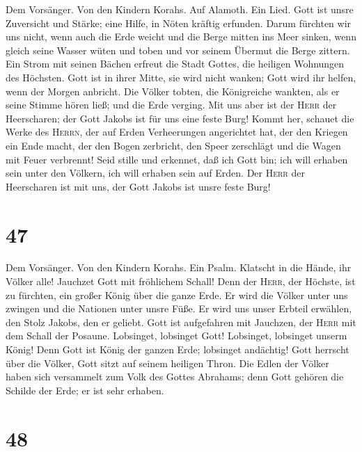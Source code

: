  Dem Vorsänger. Von den Kindern Korahs. Auf Alamoth. Ein
Lied. Gott ist unsre Zuversicht und Stärke; eine Hilfe, in Nöten kräftig
erfunden.  Darum fürchten wir uns nicht, wenn auch die
Erde weicht und die Berge mitten ins Meer sinken,  wenn
gleich seine Wasser wüten und toben und vor seinem Übermut die Berge
zittern.  Ein Strom mit seinen Bächen erfreut die Stadt
Gottes, die heiligen Wohnungen des Höchsten.  Gott ist in
ihrer Mitte, sie wird nicht wanken; Gott wird ihr helfen, wenn der
Morgen anbricht.  Die Völker tobten, die Königreiche
wankten, als er seine Stimme hören ließ; und die Erde verging.
 Mit uns aber ist der \textsc{Herr} der Heerscharen; der
Gott Jakobs ist für uns eine feste Burg!  Kommt her,
schauet die Werke des \textsc{Herrn}, der auf Erden Verheerungen
angerichtet hat,  der den Kriegen ein Ende macht, der den
Bogen zerbricht, den Speer zerschlägt und die Wagen mit Feuer verbrennt!
 Seid stille und erkennet, daß ich Gott bin; ich will
erhaben sein unter den Völkern, ich will erhaben sein auf Erden.
 Der \textsc{Herr} der Heerscharen ist mit uns, der Gott
Jakobs ist unsre feste Burg!

\hypertarget{section-46}{%
\section{47}\label{section-46}}

 Dem Vorsänger. Von den Kindern Korahs. Ein Psalm.
Klatscht in die Hände, ihr Völker alle! Jauchzet Gott mit fröhlichem
Schall!  Denn der \textsc{Herr}, der Höchste, ist zu
fürchten, ein großer König über die ganze Erde.  Er wird
die Völker unter uns zwingen und die Nationen unter unsre Füße.
 Er wird uns unser Erbteil erwählen, den Stolz Jakobs, den
er geliebt.  Gott ist aufgefahren mit Jauchzen, der
\textsc{Herr} mit dem Schall der Posaune.  Lobsinget,
lobsinget Gott! Lobsinget, lobsinget unserm König!  Denn
Gott ist König der ganzen Erde; lobsinget andächtig!  Gott
herrscht über die Völker, Gott sitzt auf seinem heiligen Thron.
 Die Edlen der Völker haben sich versammelt zum Volk des
Gottes Abrahams; denn Gott gehören die Schilde der Erde; er ist sehr
erhaben.

\hypertarget{section-47}{%
\section{48}\label{section-47}}

